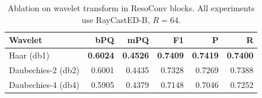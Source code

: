 \begin{table}[htbp]
\centering
\caption{Ablation on wavelet transform in ResoConv blocks. All experiments use RayCastED-B, $R=64$.}
\label{tab:ablation-wavelet}
\begin{tabular}{l r r r r r}
\hline
\textbf{Wavelet} & \textbf{bPQ} & \textbf{mPQ} & \textbf{F1} & \textbf{P} & \textbf{R} \\
\hline
Haar (db1)       & \textbf{0.6024} & \textbf{0.4526} & \textbf{0.7409} & \textbf{0.7419} & \textbf{0.7400} \\
Daubechies-2 (db2) & 0.6001 & 0.4435 & 0.7328 & 0.7269 & 0.7388 \\
Daubechies-4 (db4) & 0.5905 & 0.4379 & 0.7148 & 0.7046 & 0.7252 \\
\hline
\end{tabular}
\end{table}
